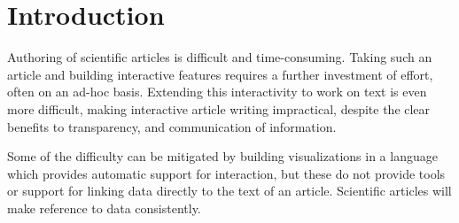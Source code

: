 \section{Introduction}

Authoring of scientific articles is difficult and time-consuming. Taking such
an article and building interactive features requires a further investment of
effort, often on an ad-hoc basis. Extending this interactivity to work on text
is even more difficult, making interactive article writing impractical, despite
the clear benefits to transparency, and communication of information.

Some of the difficulty can be mitigated by building visualizations in a language
which provides automatic support for interaction, but these do not provide tools
or support for linking data directly to the text of an article. Scientific articles
will make reference to data consistently.